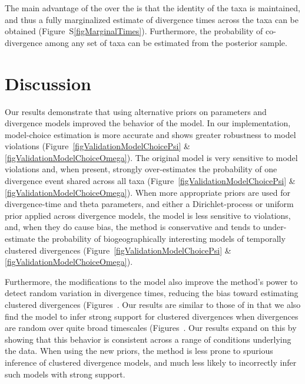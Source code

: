 The main advantage of the \npModelDPPOrdered over the \npModelDPP is that the
identity of the taxa is maintained, and thus a fully marginalized estimate of
divergence times across the taxa can be obtained
(Figure~S\ref{figMarginalTimes}).
Furthermore, the probability of co-divergence among any set of taxa can be
estimated from the posterior sample.

\section*{Discussion}
Our results demonstrate that using alternative priors on parameters and
divergence models improved the behavior of the \msb model.
In our implementation, model-choice estimation is more accurate and shows
greater robustness to model violations
(Figure~\ref{figValidationModelChoicePsi} \&
\ref{figValidationModelChoiceOmega}).
The original model is very sensitive to model violations and, when present,
strongly over-estimates the probability of one divergence event shared
across all taxa
(Figure~\ref{figValidationModelChoicePsi} \&
\ref{figValidationModelChoiceOmega}).
When more appropriate priors are used for divergence-time and theta parameters,
and either a Dirichlet-process or uniform prior applied across divergence
models, the model is less sensitive to violations, and, when they do cause
bias, the method is conservative and tends to under-estimate the probability of
biogeographically interesting models of temporally clustered divergences
(Figure~\ref{figValidationModelChoicePsi} \&
\ref{figValidationModelChoiceOmega}).

Furthermore, the modifications to the model also improve the method's power to
detect random variation in divergence times, reducing the bias toward
estimating clustered divergences
(Figures~.
Our results are similar to those of \citet{Oaks2012} in that we also find
the \msb model to infer strong support for clustered divergences when
divergences are random over quite broad timescales
(Figures~.
Our results expand on this by showing that this behavior is consistent
across a range of conditions underlying the data.
When using the new priors, the method is less prone to spurious inference of
clustered divergence models, and much less likely to incorrectly infer such
models with strong support.

